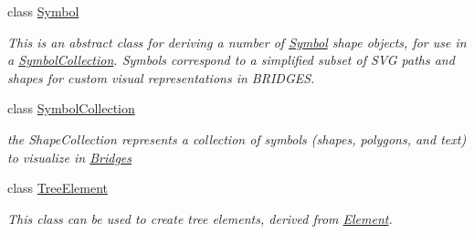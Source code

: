 \begin{DoxyCompactItemize}
class \hyperlink{classbridges_1_1datastructure_1_1_symbol}{Symbol}
\begin{DoxyCompactList}\small\item\em This is an abstract class for deriving a number of \hyperlink{classbridges_1_1datastructure_1_1_symbol}{Symbol} shape objects, for use in a \hyperlink{classbridges_1_1datastructure_1_1_symbol_collection}{Symbol\+Collection}. Symbols correspond to a simplified subset of S\+VG paths and shapes for custom visual representations in B\+R\+I\+D\+G\+ES. \end{DoxyCompactList}\item 
class \hyperlink{classbridges_1_1datastructure_1_1_symbol_collection}{Symbol\+Collection}
\begin{DoxyCompactList}\small\item\em the Shape\+Collection represents a collection of symbols (shapes, polygons, and text) to visualize in \hyperlink{classbridges_1_1_bridges}{Bridges} \end{DoxyCompactList}\item 
class \hyperlink{classbridges_1_1datastructure_1_1_tree_element}{Tree\+Element}
\begin{DoxyCompactList}\small\item\em This class can be used to create tree elements, derived from \hyperlink{classbridges_1_1datastructure_1_1_element}{Element}. \end{DoxyCompactList}\end{DoxyCompactItemize}
